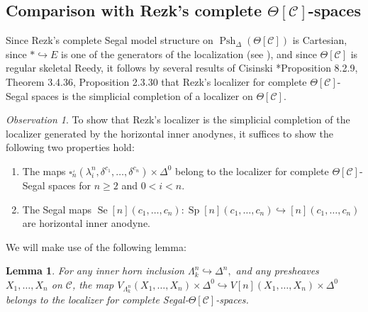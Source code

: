\documentclass[leqno]{article}
\numberwithin{equation}{subsection}
\theoremstyle{plain}   %
\newtheorem{lemma}[equation]{Lemma}
\theoremstyle{remark}
\newtheorem{obs}[equation]{Observation}
\theoremstyle{plain}
\DeclareMathOperator{\Psh}{Psh}
\providecommand{\C}{}
\renewcommand{\C}{\ensuremath{\mathcal{C}}}
\begin{document}
\subsection{Comparison with Rezk's complete \(\Theta[\C]\)-spaces}\label{rezkcomparison}
Since Rezk's complete Segal model structure on \(\Psh_\Delta(\Theta[\C])\) is Cartesian, since \(\ast \hookrightarrow E\) is one of the generators of the localization (see \cite{rezk-theta-n-spaces}), and since \(\Theta[\C]\) is regular skeletal Reedy, it follows by several results of Cisinski \cite{cisinski-book}*{Proposition 8.2.9, Theorem 3.4.36, Proposition 2.3.30} that Rezk's localizer for complete \(\Theta[\C]\)-Segal spaces is the simplicial completion of a localizer on \(\Theta[\C]\).  
\begin{obs}
	To show that Rezk's localizer is the simplicial completion of the localizer generated by the horizontal inner anodynes, it suffices to show the following two properties hold:
	\begin{enumerate}[\indent (i)] 
		\item The maps 
		\(\square_n^\lrcorner(\lambda^n_i,\delta^{c_1},\dots,\delta^{c_n})\times \Delta^0\) belong to the localizer for complete \(\Theta[\C]\)-Segal spaces for \(n\geq 2\) and \(0<i<n\).
		\item The Segal maps \(\operatorname{Se}[n](c_1,\dots,c_n): \operatorname{Sp}[n](c_1,\dots,c_n) \hookrightarrow [n](c_1,\dots,c_n)\) are horizontal inner anodyne.
	\end{enumerate}
\end{obs}
We will make use of the following lemma:
\begin{lemma}\label{precatproperty}
	For any inner horn inclusion \(\Lambda^n_k\hookrightarrow \Delta^n,\) and any presheaves \(X_1,\dots,X_n\) on \(\C\), the map \(V_{\Lambda^n_k}(X_1,\dots,X_n)\times \Delta^0 \hookrightarrow V[n](X_1,\dots,X_n)\times \Delta^0\) belongs to the localizer for complete Segal-\(\Theta[\C]\)-spaces.
\end{lemma}
\end{document}
